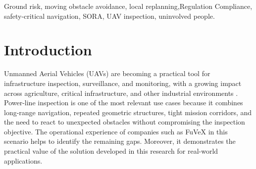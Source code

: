 \documentclass[journal,twoside,web]{ieeecolor}
\begin{document}
\begin{abstract}
Autonomous UAV obstacle avoidance is not new, but most existing algorithms focus on collision-free flight, geometric efficiency, or dynamic feasibility. Much less work addresses the European regulatory logic that an autonomous route should avoid exposing uninvolved people and other protected ground parties to unnecessary overflight risk. This paper presents Path Planning and Moving Obstacle Avoidance Regulatory Compliant Evasion, a deterministic real-time local replanning method for waypoint-preserving obstacle avoidance in autonomous power-line inspection missions. The method is implemented and evaluated inside a simulated real environment in Unreal, where it operates together with a waypoint-driven flight controller, a YOLO-based perception front-end, and a  monocular obstacle geopositioning. In the current implementation, civilian-like detections and nearby entities are converted into protected local no-fly regions that trigger conservative detours instead of nominal overflight. Based on the literature reviewed for 2024--2026, we are not aware of a published method that combines this EASA-motivated no-overflight objective with deterministic online local replanning and autonomous power-line inspection integration in the same way. The presented results show the proposed solution as a reproducible, low-overhead, and auditable local replanning method that operationalizes part of the European ground-risk logic at the online controller level, while the simulated workflow provides the integration and validation environment used to characterize its behavior.
\end{abstract}

\begin{IEEEkeywords}
 Ground risk, moving obstacle avoidance, local replanning,Regulation Compliance,  safety-critical navigation, SORA, UAV inspection, uninvolved people.
\end{IEEEkeywords}

\section{Introduction}
\label{sec:introduction}

Unmanned Aerial Vehicles (UAVs) are becoming a practical tool for infrastructure inspection, surveillance, and monitoring, with a growing impact across agriculture, critical infrastructure, and other industrial environments \cite{imran2025environmental,marut2024surveillance}. Power-line inspection is one of the most relevant use cases because it combines long-range navigation, repeated geometric structures, tight mission corridors, and the need to react to unexpected obstacles without compromising the inspection objective. The operational experience of companies such as FuVeX in this scenario helps to identify the remaining gaps. Moreover, it demonstrates the practical value of the solution developed in this research for real-world applications.  %
\end{document}
